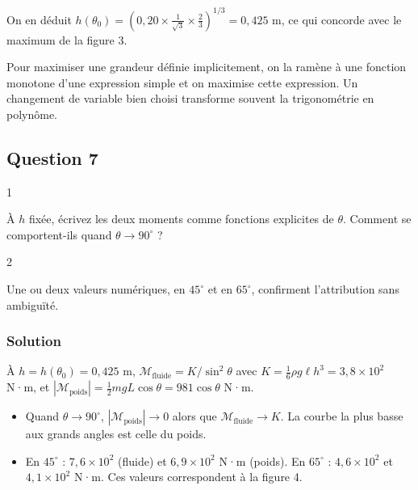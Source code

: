 \documentclass[11pt,a4paper]{article}
\providecommand{\tightlist}{\setlength{\itemsep}{0pt}\setlength{\parskip}{0pt}}
\newcommand{\equationajustee}[1]{%
  \sbox{\boiteequation}{$\displaystyle #1$}%
  \ifdim\wd\boiteequation>\linewidth
    \[\resizebox{\linewidth}{!}{\usebox{\boiteequation}}\]%
  \else
    \[#1\]%
  \fi}
\begin{document}
\equationajustee{\boxed{\theta_0=\arccos\frac1{\sqrt3}\approx54{,}7^\circ}}

On en déduit \(h(\theta_0)=\left(0{,}20\times\frac1{\sqrt3}\times\frac23\right)^{1/3}=0{,}425\) m, ce qui concorde avec le maximum de la figure 3.

\begin{methode}

Pour maximiser une grandeur définie implicitement, on la ramène à une fonction monotone d'une expression simple et on maximise cette expression. Un changement de variable bien choisi transforme souvent la trigonométrie en polynôme.

\end{methode}

\hypertarget{question-7}{%
\subsection{Question 7}\label{question-7}}

\begin{indication}{1}

À \(h\) fixée, écrivez les deux moments comme fonctions explicites de \(\theta\). Comment se comportent-ils quand \(\theta\to90^\circ\) ?

\end{indication}

\begin{indication}{2}

Une ou deux valeurs numériques, en \(45^\circ\) et en \(65^\circ\), confirment l'attribution sans ambiguïté.

\end{indication}

\hypertarget{solution-6}{%
\subsubsection{Solution}\label{solution-6}}

À \(h=h(\theta_0)=0{,}425\) m, \(\mathcal M_{\text{fluide}}=K/\sin^2\theta\) avec \(K=\frac16\rho g\ell h^3=3{,}8\times10^2\) N·m, et \(|\mathcal M_{\text{poids}}|=\frac12mgL\cos\theta=981\cos\theta\) N·m.

\begin{itemize}
\tightlist
\item
  Quand \(\theta\to90^\circ\), \(|\mathcal M_{\text{poids}}|\to0\) alors que \(\mathcal M_{\text{fluide}}\to K\). La courbe la plus basse aux grands angles est celle du poids.
\item
  En \(45^\circ\) : \(7{,}6\times10^2\) (fluide) et \(6{,}9\times10^2\) N·m (poids). En \(65^\circ\) : \(4{,}6\times10^2\) et \(4{,}1\times10^2\) N·m. Ces valeurs correspondent à la figure 4.
\end{itemize}
\end{document}
